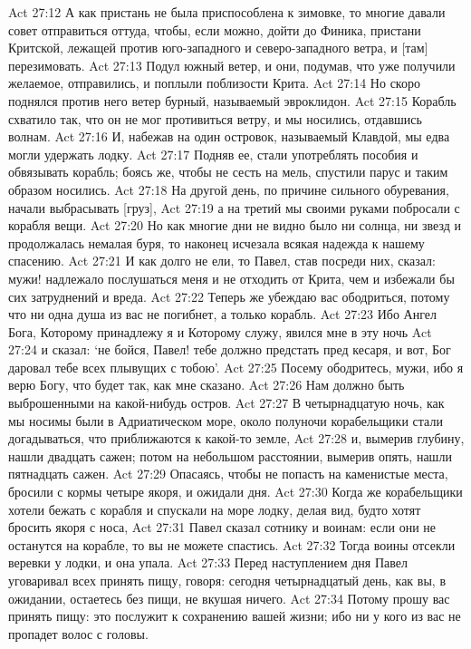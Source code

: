 Act 27:12  А как пристань не была приспособлена к зимовке, то многие давали совет отправиться оттуда, чтобы, если можно, дойти до Финика, пристани Критской, лежащей против юго-западного и северо-западного ветра, и [там] перезимовать.
Act 27:13  Подул южный ветер, и они, подумав, что уже получили желаемое, отправились, и поплыли поблизости Крита.
Act 27:14  Но скоро поднялся против него ветер бурный, называемый эвроклидон.
Act 27:15  Корабль схватило так, что он не мог противиться ветру, и мы носились, отдавшись волнам.
Act 27:16  И, набежав на один островок, называемый Клавдой, мы едва могли удержать лодку.
Act 27:17  Подняв ее, стали употреблять пособия и обвязывать корабль; боясь же, чтобы не сесть на мель, спустили парус и таким образом носились.
Act 27:18  На другой день, по причине сильного обуревания, начали выбрасывать [груз],
Act 27:19  а на третий мы своими руками побросали с корабля вещи.
Act 27:20  Но как многие дни не видно было ни солнца, ни звезд и продолжалась немалая буря, то наконец исчезала всякая надежда к нашему спасению.
Act 27:21  И как долго не ели, то Павел, став посреди них, сказал: мужи! надлежало послушаться меня и не отходить от Крита, чем и избежали бы сих затруднений и вреда.
Act 27:22  Теперь же убеждаю вас ободриться, потому что ни одна душа из вас не погибнет, а только корабль.
Act 27:23  Ибо Ангел Бога, Которому принадлежу я и Которому служу, явился мне в эту ночь
Act 27:24  и сказал: `не бойся, Павел! тебе должно предстать пред кесаря, и вот, Бог даровал тебе всех плывущих с тобою'.
Act 27:25  Посему ободритесь, мужи, ибо я верю Богу, что будет так, как мне сказано.
Act 27:26  Нам должно быть выброшенными на какой-нибудь остров.
Act 27:27  В четырнадцатую ночь, как мы носимы были в Адриатическом море, около полуночи корабельщики стали догадываться, что приближаются к какой-то земле,
Act 27:28  и, вымерив глубину, нашли двадцать сажен; потом на небольшом расстоянии, вымерив опять, нашли пятнадцать сажен.
Act 27:29  Опасаясь, чтобы не попасть на каменистые места, бросили с кормы четыре якоря, и ожидали дня.
Act 27:30  Когда же корабельщики хотели бежать с корабля и спускали на море лодку, делая вид, будто хотят бросить якоря с носа,
Act 27:31  Павел сказал сотнику и воинам: если они не останутся на корабле, то вы не можете спастись.
Act 27:32  Тогда воины отсекли веревки у лодки, и она упала.
Act 27:33  Перед наступлением дня Павел уговаривал всех принять пищу, говоря: сегодня четырнадцатый день, как вы, в ожидании, остаетесь без пищи, не вкушая ничего.
Act 27:34  Потому прошу вас принять пищу: это послужит к сохранению вашей жизни; ибо ни у кого из вас не пропадет волос с головы.
